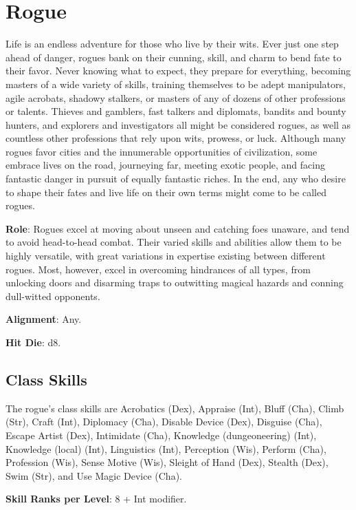 \section{Rogue}

\label{f0}				
Life is an endless adventure for those who live by their wits. Ever just one step ahead of danger, rogues bank on their cunning, skill, and charm to bend fate to their favor. Never knowing what to expect, they prepare for everything, becoming masters of a wide variety of skills, training themselves to be adept manipulators, agile acrobats, shadowy stalkers, or masters of any of dozens of other professions or talents. Thieves and gamblers, fast talkers and diplomats, bandits and bounty hunters, and explorers and investigators all might be considered rogues, as well as countless other professions that rely upon wits, prowess, or luck. Although many rogues favor cities and the innumerable opportunities of civilization, some embrace lives on the road, journeying far, meeting exotic people, and facing fantastic danger in pursuit of equally fantastic riches. In the end, any who desire to shape their fates and live life on their own terms might come to be called rogues.
				
\textbf{Role}: Rogues excel at moving about unseen and catching foes unaware, and tend to avoid head-to-head combat. Their varied skills and abilities allow them to be highly versatile, with great variations in expertise existing between different rogues. Most, however, excel in overcoming hindrances of all types, from unlocking doors and disarming traps to outwitting magical hazards and conning dull-witted opponents.
				
\textbf{Alignment}: Any.
				
\textbf{Hit Die}: d8.
				
\subsection{Class Skills}

				
The rogue's class skills are Acrobatics (Dex), Appraise (Int), Bluff (Cha), Climb (Str), Craft (Int), Diplomacy (Cha), Disable Device (Dex), Disguise (Cha), Escape Artist (Dex), Intimidate (Cha), Knowledge (dungeoneering) (Int), Knowledge (local) (Int), Linguistics (Int), Perception (Wis), Perform (Cha), Profession (Wis), Sense Motive (Wis), Sleight of Hand (Dex), Stealth (Dex), Swim (Str), and Use Magic Device (Cha). 
				
\textbf{Skill Ranks per Level}: 8 + Int modifier.

